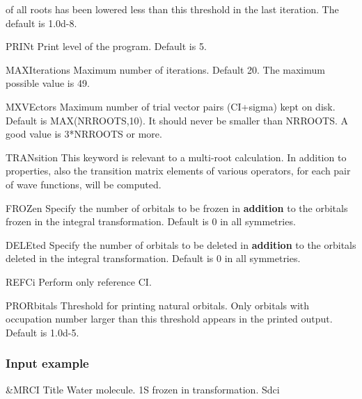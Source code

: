 \begin{keywordlist}
of all roots has been lowered less than this threshold in the last
iteration. The default is 1.0d-{}8.
\item[PRINt]
Print level of the program. Default is 5.
\item[MAXIterations]
Maximum number of iterations. Default 20. The maximum possible value is 49.
\item[MXVEctors]
Maximum number of trial vector pairs (CI+sigma) kept on
disk. Default is MAX(NRROOTS,10). It should never be
smaller than NRROOTS. A good value is 3*NRROOTS or more.
\item[TRANsition]
This keyword is relevant to a multi-{}root calculation. In addition
to properties, also
the transition matrix elements of various operators, for each pair
of wave functions, will be computed.
\item[FROZen]
Specify the number of orbitals to be frozen in
{\bf addition} to the orbitals frozen in the integral transformation.
Default is 0 in all symmetries.
\item[DELEted]
Specify the number of orbitals to be deleted in
{\bf addition} to the orbitals deleted in the integral transformation.
Default is 0 in all symmetries.
\item[REFCi]
Perform only reference CI.
\item[PRORbitals]
Threshold for printing natural orbitals. Only orbitals with occupation
number larger than this threshold appears in the printed output.
Default is 1.0d-{}5.
\end{keywordlist}

\subsubsection{Input example}

\begin{inputlisting}
 &MRCI
Title
 Water molecule. 1S frozen in transformation.
Sdci
\end{inputlisting}
